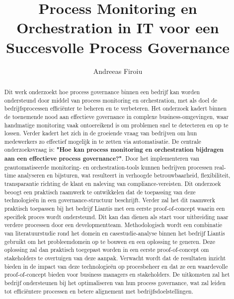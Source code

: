 \documentclass{hogent-article}
\title{Process Monitoring en Orchestration in IT voor een Succesvolle Process Governance}
\author{Andreeas Firoiu}
\begin{document}
\begin{abstract}
  Dit werk onderzoekt hoe process governance binnen een bedrijf kan worden ondersteund door middel van process monitoring en orchestration, met als doel de bedrijfsprocessen efficiënter te beheren en te verbeteren. Het onderzoek kadert binnen de toenemende nood aan effectieve governance in complexe business-omgevingen, waar handmatige monitoring vaak ontoereikend is om problemen snel te detecteren en op te lossen. Verder kadert het zich in de groeiende vraag van bedrijven om hun medewerkers zo effectief mogelijk in te zetten via automatisatie. De centrale onderzoeksvraag is: \textbf{"Hoe kan process monitoring en orchestration bijdragen aan een effectieve process governance?"}. Door het implementeren van geautomatiseerde monitoring- en orchestration-tools kunnen bedrijven processen real-time analyseren en bijsturen, wat resulteert in verhoogde betrouwbaarheid, flexibiliteit, transparantie richting de klant en naleving van compliance-vereisten. Dit onderzoek beoogt een praktisch raamwerk te ontwikkelen dat de toepassing van deze technologieën in een governance-structuur beschrijft. Verder zal het dit raamwerk praktisch toepassen bij het bedrijf Liantis met een eerste proof-of-concept waarin een specifiek proces wordt ondersteund. Dit kan dan dienen als start voor uitbreiding naar verdere processen door een developmentteam. Methodologisch wordt een combinatie van literatuurstudie rond het domein en casestudie-analyse binnen het bedrijf Liantis gebruikt om het probleemdomein op te bouwen en een oplossing te generen. Deze oplossing zal dan praktisch toegepast worden in een eerste proof-of-concept om stakeholders te overtuigen van deze aanpak. Verwacht wordt dat de resultaten inzicht bieden in de impact van deze technologieën op procesbeheer en dat ze een waardevolle proof-of-concept bieden voor business managers en stakeholders. De uitkomsten zal het bedrijf ondersteunen bij het optimaliseren van hun process governance, wat zal leiden tot efficiëntere processen en betere alignement met bedrijfsdoelstellingen.
\end{abstract}

\tableofcontents



\printbibliography[heading=bibintoc]
\end{document}
